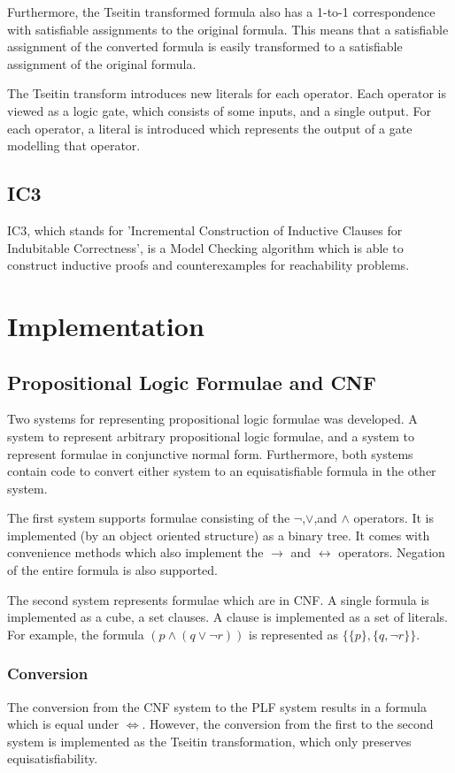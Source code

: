\documentclass[a4paper]{article}
\begin{document}
Furthermore, the Tseitin transformed formula also has a 1-to-1 correspondence with satisfiable assignments to the original formula. This means that a satisfiable assignment of the converted formula is easily transformed to a satisfiable assignment of the original formula.

The Tseitin transform introduces new literals for each operator. Each operator is viewed as a logic gate, which consists of some inputs, and a single output. For each operator, a literal is introduced which represents the output of a gate modelling that operator.


\subsection{IC3}
IC3, which stands for 'Incremental Construction of Inductive Clauses for Indubitable Correctness', is a Model Checking algorithm which is able to construct inductive proofs and counterexamples for reachability problems.


\section{Implementation}
\subsection{Propositional Logic Formulae and CNF}
Two systems for representing propositional logic formulae was developed. A system to represent arbitrary propositional logic formulae, and a system to represent formulae in conjunctive normal form. Furthermore, both systems contain code to convert either system to an equisatisfiable formula in the other system.

The first system supports formulae consisting of the $\lnot$,$\lor$,and $\land$ operators. It is implemented (by an object oriented structure) as a binary tree. It comes with convenience methods which also implement the $\rightarrow$ and $\leftrightarrow$ operators. Negation of the entire formula is also supported.

The second system represents formulae which are in CNF. A single formula is implemented as a cube, a set clauses. A clause is implemented as a set of literals. For example, the formula $(p \land (q \lor \lnot r))$ is represented as $\{\{p\},\{q,\lnot r\}\}$.
\subsubsection{Conversion}
The conversion from the CNF system to the PLF system results in a formula which is equal under $\Leftrightarrow$. However, the conversion from the first to the second system is implemented as the Tseitin transformation, which only preserves equisatisfiability.
\end{document}
